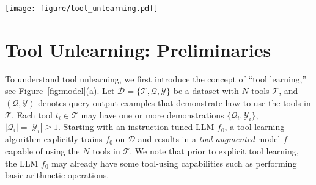 \begin{figure*}[t]
  \centering
  \texttt{[image: figure/tool\_unlearning.pdf]}
  \vspace{-10pt}
  \caption{Tool Unlearning and the proposed \method approach. \textbf{(a)}: Illustration of tool learning and tool unlearning. Learned tools may be requested to be unlearned due to many reasons, such as tools being insecure, restricted, or deprecated. \textbf{(b)}: Differences between tool unlearning and traditional sample unlearning, in terms of objective and training data. \textbf{(c)}: Proposed method \method. We encourage the unlearned model $f'$ to follow the tool-free LLM $f_0$ which has never seen $T_f$ before. Meanwhile, we maintain its ability on $T_r$ and general tasks by matching the capabilities of tool-augmented model $f$ through task arithmetic.}
  \label{fig:model}
    \vspace{-10pt}
\end{figure*}

\section{Tool Unlearning: Preliminaries}\label{sec:prem} %

To understand tool unlearning, we first introduce the concept of ``tool learning,'' see Figure~\ref{fig:model}(a). Let $\mathcal{D} = \{ \mathcal{T}, \mathcal{Q}, \mathcal{Y} \}$ be a dataset with $N$ tools $\mathcal{T}$, and $(\mathcal{Q}, \mathcal{Y})$ denotes query-output examples that demonstrate how to use the tools in $\mathcal{T}$. 
Each tool $t_i \in \mathcal{T}$ may have one or more demonstrations $\{\mathcal{Q}_i, \mathcal{Y}_i\}$, $|\mathcal{Q}_i| = |\mathcal{Y}_i| \geq 1$. 
Starting with an instruction-tuned LLM $f_0$, 
a tool learning algorithm explicitly trains $f_0$ on $\mathcal{D}$ and results in a {\em tool-augmented} model $f$ capable of using the $N$ tools in $\mathcal{T}$. We note that prior to explicit tool learning, the LLM $f_0$ may already have some tool-using capabilities such as performing basic arithmetic operations. 



